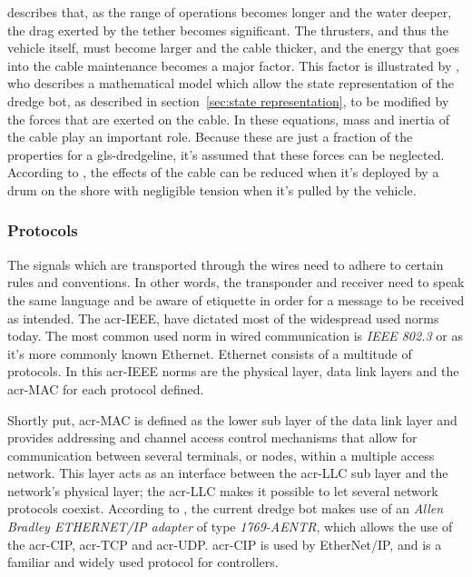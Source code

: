 \citet{westneat_advances_1983} describes that, as the range of operations becomes longer and the water deeper, the 
drag exerted by the tether becomes significant. The thrusters, and thus the vehicle itself, must become larger and 
the cable thicker, and the energy that goes into the cable maintenance becomes a major factor. This factor is 
illustrated by \citet{fang_motions_2007}, who describes a mathematical model which allow the state representation of 
the dredge bot, as described in section~\ref{sec:state representation}, to be modified by the forces that are exerted
on the cable. In these equations, mass and inertia of the cable play an important role. Because these are just a 
fraction of the properties for a \gls{gls-dredgeline}, it's assumed that these forces can be neglected. According to 
\citet{feng_evaluation_2004}, the effects of the cable can be reduced when it's deployed by a drum on the shore with 
negligible tension when it's pulled by the vehicle.

\subsubsection*{Protocols}\label{sec:wired_protocols}
The signals which are transported through the wires need to adhere to certain rules and conventions. In other words, 
the transponder and receiver need to speak the same language and be aware of etiquette in order for a message to be 
received as intended. The \gls{acr-IEEE}, have dictated most of the widespread used norms today. The most common used
norm in wired communication is \textit{IEEE 802.3} or as it's more commonly known Ethernet. Ethernet consists of a 
multitude of protocols. In this \gls{acr-IEEE} norms are the physical layer, data link layers and the \gls{acr-MAC} 
for each protocol defined.

Shortly put, \gls{acr-MAC} is defined as the lower sub layer of the data link layer and provides addressing and 
channel access control mechanisms that allow for communication between several terminals, or nodes, within a multiple
access network. This layer acts as an interface between the \gls{acr-LLC} sub layer and the network's physical layer;
the \gls{acr-LLC} makes it possible to let several network protocols coexist. According to \citet{jolectra_plc_2016},
the current dredge bot makes use of an \textit{Allen Bradley ETHERNET/IP adapter} of type \textit{1769-AENTR}, which 
allows the use of the \gls{acr-CIP}, \gls{acr-TCP} and \gls{acr-UDP}. \gls{acr-CIP} is used by EtherNet/IP, and is a 
familiar and widely used protocol for controllers.

